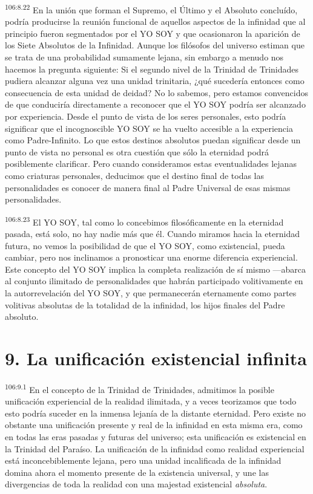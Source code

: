 \documentclass[twoside, 11pt]{book}
\begin{document}
\par
\textsuperscript{106:8.22} En la unión que forman el Supremo, el Último y el Absoluto concluído, podría producirse la reunión funcional de aquellos aspectos de la infinidad que al principio fueron segmentados por el YO SOY y que ocasionaron la aparición de los Siete Absolutos de la Infinidad. Aunque los filósofos del universo estiman que se trata de una probabilidad sumamente lejana, sin embargo a menudo nos hacemos la pregunta siguiente: Si el segundo nivel de la Trinidad de Trinidades pudiera alcanzar alguna vez una unidad trinitaria, ¿qué sucedería entonces como consecuencia de esta unidad de deidad? No lo sabemos, pero estamos convencidos de que conduciría directamente a reconocer que el YO SOY podría ser alcanzado por experiencia. Desde el punto de vista de los seres personales, esto podría significar que el incognoscible YO SOY se ha vuelto accesible a la experiencia como Padre-Infinito. Lo que estos destinos absolutos puedan significar desde un punto de vista no personal es otra cuestión que sólo la eternidad podrá posiblemente clarificar. Pero cuando consideramos estas eventualidades lejanas como criaturas personales, deducimos que el destino final de todas las personalidades es conocer de manera final al Padre Universal de esas mismas personalidades.

\par
\textsuperscript{106:8.23} El YO SOY, tal como lo concebimos filosóficamente en la eternidad pasada, está solo, no hay nadie más que él. Cuando miramos hacia la eternidad futura, no vemos la posibilidad de que el YO SOY, como existencial, pueda cambiar, pero nos inclinamos a pronosticar una enorme diferencia experiencial. Este concepto del YO SOY implica la completa realización de sí mismo ---abarca al conjunto ilimitado de personalidades que habrán participado volitivamente en la autorrevelación del YO SOY, y que permanecerán eternamente como partes volitivas absolutas de la totalidad de la infinidad, los hijos finales del Padre absoluto.

\section*{9. La unificación existencial infinita}
\par
\textsuperscript{106:9.1} En el concepto de la Trinidad de Trinidades, admitimos la posible unificación experiencial de la realidad ilimitada, y a veces teorizamos que todo esto podría suceder en la inmensa lejanía de la distante eternidad. Pero existe no obstante una unificación presente y real de la infinidad en esta misma era, como en todas las eras pasadas y futuras del universo; esta unificación es existencial en la Trinidad del Paraíso. La unificación de la infinidad como realidad experiencial está inconcebiblemente lejana, pero una unidad incalificada de la infinidad domina ahora el momento presente de la existencia universal, y une las divergencias de toda la realidad con una majestad existencial \textit{absoluta}.
\end{document}
